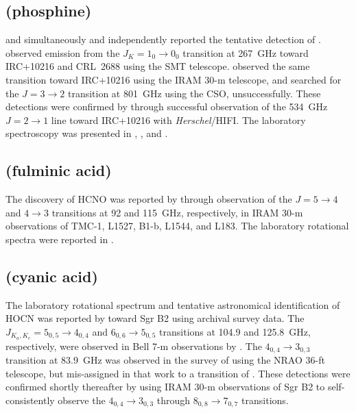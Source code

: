 \documentclass[twocolumn]{aastex631}
\begin{document}
	\subsection{ (phosphine)}
	\label{PH3}
	
	\citet{Agundez:2008kh} and \citet{Tenenbaum:2008ke} simultaneously and independently reported the tentative detection of .  \citet{Tenenbaum:2008ke} observed emission from the $J_K = 1_0\rightarrow0_0$ transition at 267~GHz toward IRC+10216 and CRL~2688 using the SMT telescope.  \citet{Agundez:2008kh} observed the same transition toward IRC+10216 using the IRAM 30-m telescope, and searched for the $J = 3\rightarrow2$ transition at 801~GHz using the CSO, unsuccessfully.  These detections were confirmed by \citet{Agundez:2014lw} through successful observation of the 534~GHz $J = 2\rightarrow1$ line toward IRC+10216 with \emph{Herschel}/HIFI.  The laboratory spectroscopy was presented in \citet{Cazzoli:2006dr}, \citet{SousaSilva:2013kr}, and \citet{Muller:2013fc}.
	
	\subsection{ (fulminic acid)}
	\label{HCNO}
	
	The discovery of HCNO was reported by \citet{Marcelino:2009jj} through observation of the $J = 5\rightarrow4$ and $4\rightarrow3$ transitions at 92 and 115~GHz, respectively, in IRAM 30-m observations of TMC-1, L1527, B1-b, L1544, and L183.  The laboratory rotational spectra were reported in \citet{Winnewisser:1971fh}.
	
	\subsection{ (cyanic acid)}
	\label{HOCN}
	
    The laboratory rotational spectrum and tentative astronomical identification of HOCN was reported by \citet{Brunken:2009ew} toward Sgr B2 using archival survey data.  The $J_{K_a,K_c} = 5_{0,5}\rightarrow4_{0,4}$ and $6_{0,6}\rightarrow5_{0,5}$ transitions at 104.9 and 125.8~GHz, respectively, were observed in Bell 7-m observations by \citet{Cummins:1986yt}. The $4_{0,4}\rightarrow3_{0,3}$ transition at 83.9~GHz was observed in the survey of \citet{Turner:1989rt} using the NRAO 36-ft telescope, but mis-assigned in that work to a transition of . These detections were confirmed shortly thereafter by \citet{Brunken:2010hp} using IRAM 30-m observations of Sgr B2 to self-consistently observe the $4_{0,4}\rightarrow3_{0,3}$ through $8_{0,8}\rightarrow7_{0,7}$ transitions.
    
\end{document}
